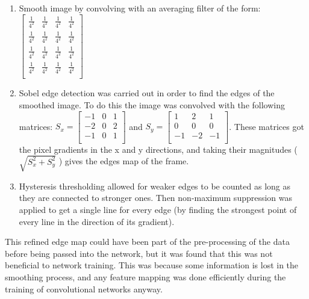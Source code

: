 \begin{enumerate}
    \item Smooth image by convolving with an averaging filter of the form: $ \begin{bmatrix}
        \frac{1}{4^2} & \frac{1}{4^2}  & \frac{1}{4^2}  & \frac{1}{4^2} \\
        \frac{1}{4^2} & \frac{1}{4^2}  & \frac{1}{4^2}  & \frac{1}{4^2} \\
        \frac{1}{4^2} & \frac{1}{4^2}  & \frac{1}{4^2}  & \frac{1}{4^2} \\
        \frac{1}{4^2} & \frac{1}{4^2}  & \frac{1}{4^2}  & \frac{1}{4^2} \\
    \end{bmatrix} $
    \item Sobel edge detection was carried out in order to find the edges of the smoothed image. To do this the image was convolved with the following matrices: $ S_x =
    \begin{bmatrix}
        -1 & 0 & 1 \\
        -2 & 0 & 2 \\
        -1 & 0 & 1 \\
    \end{bmatrix} $ and $ S_y = 
    \begin{bmatrix}
        1 & 2 & 1 \\
        0 & 0 & 0 \\
        -1 & -2 & -1 \\
    \end{bmatrix} $. These matrices got the pixel gradients in the x and y directions, and taking their magnitudes ( $ \sqrt{S_x^2 + S_y^2} $ ) gives the edges map of the frame.
    \item Hysteresis thresholding allowed for weaker edges to be counted as long as they are connected to stronger ones. Then non-maximum suppression was applied to get a single line for every edge (by finding the strongest point of every line in the direction of its gradient).
\end{enumerate}

This refined edge map could have been part of the pre-processing of the data before being passed into the network, but it was found that this was not beneficial to network training. This was because some information is lost in the smoothing process, and any feature mapping was done efficiently during the training of convolutional networks anyway.

